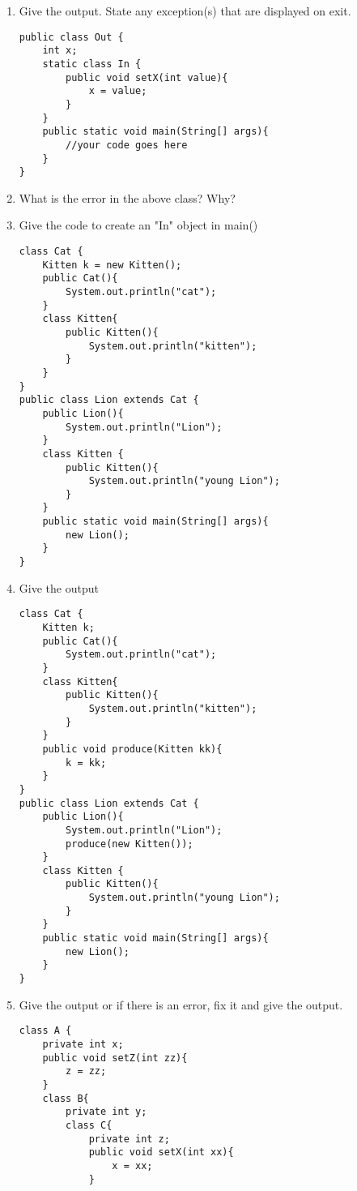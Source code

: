 \documentclass{article}
\begin{document}
\begin{enumerate}
\begin{lstlisting}
public class Test {
	public void a() throws LanguageException{
  		throw new LanguageException();
 	}
 	public void b() throws JavaException{
  		throw new JavaException();
 	}
 	public static void main(String[] args){
  		Test t = new Test(); 
  		try{
   			t.a();
   			t.b();
  		}
  		catch(LanguageException l){}
  		catch(JavaException j){}
  		System.out.println("finished main");
 	}
}
\end{lstlisting}
	\item Give the output. State any exception(s) that are displayed on exit.
\begin{lstlisting}
public class Out {
 	int x;
 	static class In {
  		public void setX(int value){
   			x = value;
  		}
 	}
 	public static void main(String[] args){
  		//your code goes here
 	}
}
\end{lstlisting}
	\item What is the error in the above class? Why?
	\item Give the code to create an "In" object in main()
	\newpage
\begin{lstlisting}
class Cat {
 	Kitten k = new Kitten();
 	public Cat(){
  		System.out.println("cat");
 	}
 	class Kitten{
  		public Kitten(){
   			System.out.println("kitten");
  		}
 	}
}
public class Lion extends Cat {
 	public Lion(){
  		System.out.println("Lion");
 	}
 	class Kitten {
  		public Kitten(){
   			System.out.println("young Lion");
  		}
 	}
 	public static void main(String[] args){
  		new Lion();
 	}
}
\end{lstlisting}
	\item Give the output
\begin{lstlisting}
class Cat {
 	Kitten k;
 	public Cat(){
  		System.out.println("cat");
 	}
 	class Kitten{
  		public Kitten(){
   			System.out.println("kitten");
  		}
 	}
 	public void produce(Kitten kk){
   		k = kk;
 	}
}
public class Lion extends Cat {
 	public Lion(){
  		System.out.println("Lion");
  		produce(new Kitten());
 	}
 	class Kitten {
  		public Kitten(){
   			System.out.println("young Lion");
  		}
 	}
 	public static void main(String[] args){
  		new Lion();
 	}
}
\end{lstlisting}
	\item Give the output or if there is an error, fix it and give the output.
\begin{lstlisting}
class A {
 	private int x;
 	public void setZ(int zz){
 		z = zz;
 	}
 	class B{
  		private int y;
  		class C{
   			private int z;
   			public void setX(int xx){
   				x = xx;
   			}

\end{lstlisting}
\end{enumerate}
\end{document}
